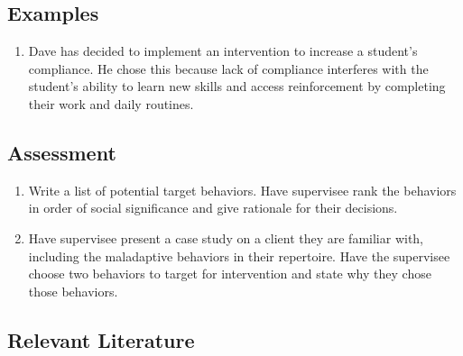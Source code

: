\subsection{Examples}
\begin{enumerate}
\item Dave has decided to implement an intervention to increase a student's compliance. He chose this because lack of compliance interferes with the student's ability to learn new skills and access reinforcement by completing their work and daily routines.
\end{enumerate}
%
\subsection{Assessment}
\begin{enumerate}
\item Write a list of potential target behaviors. Have supervisee rank the behaviors in order of social significance and give rationale for their decisions.
\item Have supervisee present a case study on a client they are familiar with, including the maladaptive behaviors in their repertoire. Have the supervisee choose two behaviors to target for intervention and state why they chose those behaviors.
\end{enumerate}
%
\subsection{Relevant Literature}
\begin{refsection}
\nocite{test,alang2017police,clayton2018black}
\printbibliography[heading=none]
\end{refsection}
